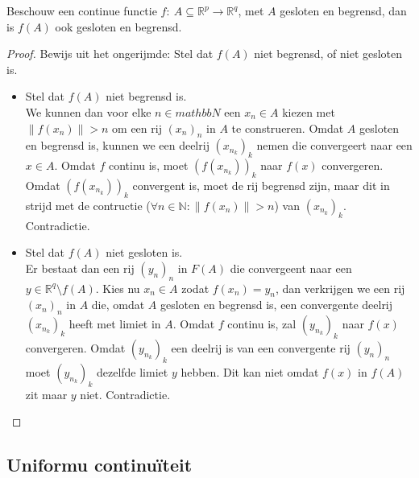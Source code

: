 \documentclass[main.tex]{subfiles}
\begin{document}
\begin{st}
  Beschouw een continue functie $f:\ A \subseteq \mathbb{R}^{p} \rightarrow \mathbb{R}^{q}$, met $A$ gesloten en begrensd, dan is $f(A)$ ook gesloten en begrensd.

  \begin{proof}
    Bewijs uit het ongerijmde: Stel dat $f(A)$ niet begrensd, of niet gesloten is.
    \begin{itemize}
    \item Stel dat $f(A)$ niet begrensd is.\\
      We kunnen dan voor elke $n\in mathbb{N}$ een $x_{n} \in A$ kiezen met $\|f(x_{n})\| > n$ om een rij $(x_{n})_{n}$ in $A$ te construeren.
      Omdat $A$ gesloten en begrensd is, kunnen we een deelrij $(x_{n_{k}})_{k}$ nemen die convergeert naar een $x\in A$.
      Omdat $f$ continu is, moet $(f(x_{n_{k}}))_{k}$ naar $f(x)$ convergeren.
      Omdat $(f(x_{n_{k}}))_{k}$ convergent is, moet de rij begrensd zijn, maar dit in strijd met de contructie ($\forall n\in \mathbb{N}: \|f(x_{n})\| > n$) van $(x_{n_{k}})_{k}$.
      Contradictie.
    \item Stel dat $f(A)$ niet gesloten is.\\
      Er bestaat dan een rij $(y_{n})_{n}$ in $F(A)$ die convergeent naar een $y\in \mathbb{R}^{q}\setminus f(A)$.
      Kies nu $x_{n} \in A$ zodat $f(x_{n}) = y_{n}$, dan verkrijgen we een rij $(x_{n})_{n}$ in $A$ die, omdat $A$ gesloten en begrensd is, een convergente deelrij $(x_{n_{k}})_{k}$ heeft met limiet in $A$.
      Omdat $f$ continu is, zal $(y_{n_{k}})_{k}$ naar $f(x)$ convergeren.
      Omdat $(y_{n_{k}})_{k}$ een deelrij is van een convergente rij $(y_{n})_{n}$ moet $(y_{n_{k}})_{k}$ dezelfde limiet $y$ hebben.
      Dit kan niet omdat $f(x)$ in $f(A)$ zit maar $y$ niet.
      Contradictie.
    \end{itemize}
  \end{proof}
\end{st}


\subsection{Uniformu continu\"iteit}
\label{sec:unif-cont}
\end{document}
